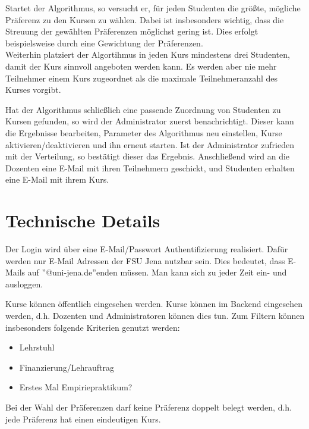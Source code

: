 \documentclass[12pt,a4paper]{article}
\begin{document}
    Startet der Algorithmus, so versucht er, für jeden Studenten die größte, mögliche Präferenz zu den Kursen zu wählen.
    Dabei ist insbesonders wichtig, dass die Streuung der gewählten Präferenzen möglichst gering ist.
    Dies erfolgt beispielsweise durch eine Gewichtung der Präferenzen.\\
    Weiterhin platziert der Algortihmus in jeden Kurs mindestens drei Studenten, damit der Kurs sinnvoll angeboten werden kann.
    Es werden aber nie mehr Teilnehmer einem Kurs zugeordnet als die maximale Teilnehmeranzahl des Kurses vorgibt.
    
    Hat der Algorithmus schließlich eine passende Zuordnung von Studenten zu Kursen gefunden, so wird der Administrator zuerst benachrichtigt.
    Dieser kann die Ergebnisse bearbeiten, Parameter des Algorithmus neu einstellen, Kurse aktivieren/deaktivieren und ihn erneut starten.
    Ist der Administrator zufrieden mit der Verteilung, so bestätigt dieser das Ergebnis.
    Anschließend wird an die Dozenten eine E-Mail mit ihren Teilnehmern geschickt, und Studenten erhalten eine E-Mail mit ihrem Kurs.
    
    \section{Technische Details}
    Der Login wird über eine E-Mail/Passwort Authentifizierung realisiert.
    Dafür werden nur E-Mail Adressen der FSU Jena nutzbar sein. Dies bedeutet, dass E-Mails auf ''@uni-jena.de''enden müssen.
    Man kann sich zu jeder Zeit ein- und ausloggen.\newline
    
    Kurse können öffentlich eingesehen werden.
    Kurse können im Backend eingesehen werden, d.h. Dozenten und Administratoren können dies tun. Zum Filtern können insbesonders folgende Kriterien genutzt werden:
        \begin{itemize}
        \item Lehrstuhl
        \item Finanzierung/Lehrauftrag
        \item Erstes Mal Empiriepraktikum?
        \end{itemize}
    
    Bei der Wahl der Präferenzen darf keine Präferenz doppelt belegt werden, d.h. jede Präferenz hat einen eindeutigen Kurs. \newline %
    
\end{document}

